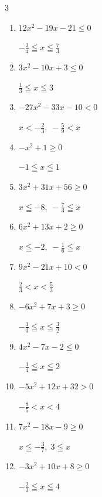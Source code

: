 \begin{multicols}{3}
\begin{enumerate}
        $\displaystyle x < -\frac{5}{4} , \; -\frac{2}{5} < x$

  \item $12x^{2}-19x-21\leq 0$

        $\displaystyle -\frac{3}{4} \leqq x \leqq \frac{7}{3}$

  \item $3x^{2}-10x+3\leq 0$

        $\displaystyle \frac{1}{3} \leqq x \leqq 3$

  \item $-27x^{2}-33x-10<0$

        $\displaystyle x < -\frac{2}{3} , \; -\frac{5}{9} < x$

  \item $-x^{2}+1\geq 0$

        $\displaystyle -1 \leqq x \leqq 1$

  \item $3x^{2}+31x+56\geq 0$

        $\displaystyle x \leqq -8 , \; -\frac{7}{3} \leqq x$

\columnbreak %

  \item $6x^{2}+13x+2\geq 0$

        $\displaystyle x \leqq -2 , \; -\frac{1}{6} \leqq x$

  \item $9x^{2}-21x+10<0$

        $\displaystyle \frac{2}{3} < x < \frac{5}{3}$

  \item $-6x^{2}+7x+3\geq 0$

        $\displaystyle -\frac{1}{3} \leqq x \leqq \frac{3}{2}$

  \item $4x^{2}-7x-2\leq 0$

        $\displaystyle -\frac{1}{4} \leqq x \leqq 2$

  \item $-5x^{2}+12x+32>0$

        $\displaystyle -\frac{8}{5} < x < 4$

  \item $7x^{2}-18x-9\geq 0$

        $\displaystyle x \leqq -\frac{3}{7} , \; 3 \leqq x$

  \item $-3x^{2}+10x+8\geq 0$

        $\displaystyle -\frac{2}{3} \leqq x \leqq 4$


\end{enumerate}
\end{multicols}
